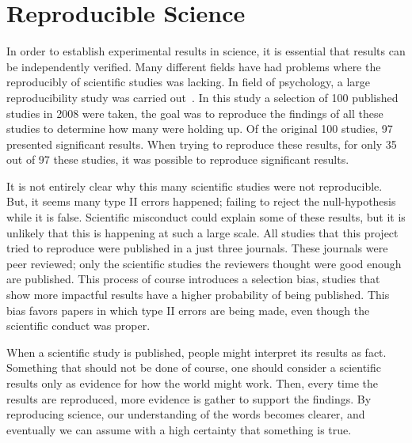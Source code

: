 \section{Reproducible Science}
In order to establish experimental results in science, it is essential that results can be independently verified. Many different fields have had problems where the reproducibly of scientific studies was lacking. In field of psychology, a large reproducibility study was carried out~\citep{psychology-reproduciblity}. In this study a selection of 100 published studies in 2008 were taken, the goal was to reproduce the findings of all these studies to determine how many were holding up. Of the original 100 studies, 97 presented significant results. When trying to reproduce these results, for only 35 out of 97 these studies, it was possible to reproduce significant results. 

It is not entirely clear why this many scientific studies were not reproducible. But, it seems many type II errors happened; failing to reject the null-hypothesis while it is false. Scientific misconduct could explain some of these results, but it is unlikely that this is happening at such a large scale. All studies that this project tried to reproduce were published in a just three journals. These journals were peer reviewed; only the scientific studies the reviewers thought were good enough are published. This process of course introduces a selection bias, studies that show more impactful results have a higher probability of being published. This bias favors papers in which type II errors are being made, even though the scientific conduct was proper. 

When a scientific study is published, people might interpret its results as fact. Something that should not be done of course, one should consider a scientific results only as evidence for how the world might work. Then, every time the results are reproduced, more evidence is gather to support the findings. By reproducing science, our understanding of the words becomes clearer, and eventually we can assume with a high certainty that something is true. 

